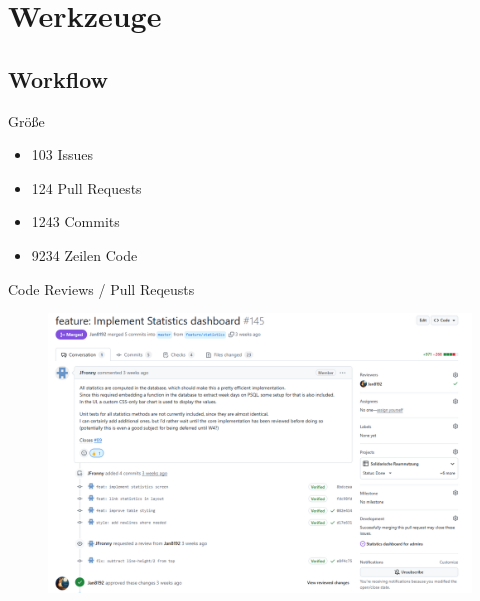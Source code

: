 \section{Werkzeuge}

\subsection{Workflow}
\begin{frame}{Größe}
    \begin{itemize}
        \item 103 Issues
        \item 124 Pull Requests
        \item 1243 Commits
        \item 9234 Zeilen Code
    \end{itemize}
\end{frame}

\begin{frame}{Code Reviews / Pull Reqeusts}
    \thispagestyle{plain}
    \begin{figure}
        \centering
        \includegraphics[width=1\linewidth]{pictures/pr_reviews}
        \label{fig:pr_reviews}
    \end{figure}
\end{frame}

